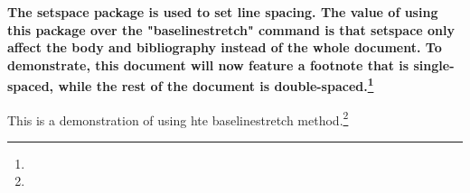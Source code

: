\documentclass{article}%
\begin{document}

    \textbf{The setspace package is used to set line spacing. The value of using this package over the "baselinestretch" command is that setspace only affect the body and bibliography instead of the whole document. To demonstrate, this document will now feature a footnote that is single-spaced, while the rest of the document is double-spaced.\footnote{\blindtext}}

    \blindtext
\newpage
    \renewcommand{\baselinestretch}{1.5}
This is a demonstration of using hte baselinestretch method.\footnote{\blindtext} \\

    \blindtext
\end{document}
